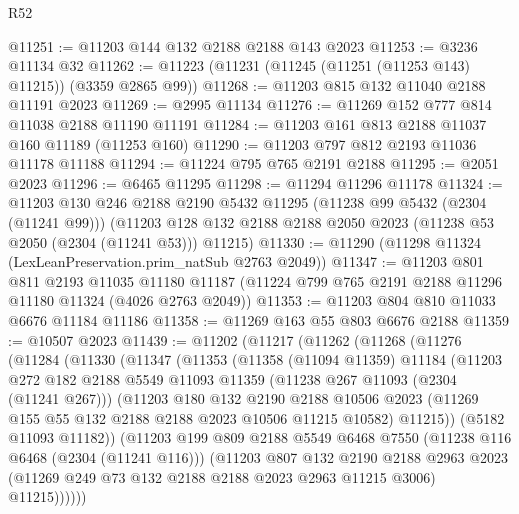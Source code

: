\begin{lexlean}{R52}
\begin{coremodule}
@11251 := @11203 @144 @132 @2188 @2188 @143 @2023
@11253 := @3236 @11134 @32
@11262 := @11223 (@11231 (@11245 (@11251 (@11253 @143) @11215)) (@3359 @2865 @99))
@11268 := @11203 @815 @132 @11040 @2188 @11191 @2023
@11269 := @2995 @11134
@11276 := @11269 @152 @777 @814 @11038 @2188 @11190 @11191
@11284 := @11203 @161 @813 @2188 @11037 @160 @11189 (@11253 @160)
@11290 := @11203 @797 @812 @2193 @11036 @11178 @11188
@11294 := @11224 @795 @765 @2191 @2188
@11295 := @2051 @2023
@11296 := @6465 @11295
@11298 := @11294 @11296 @11178
@11324 := @11203
    @130
    @246
    @2188
    @2190
    @5432
    @11295
    (@11238 @99 @5432 (@2304 (@11241 @99)))
    (@11203 @128 @132 @2188 @2188 @2050 @2023 (@11238 @53 @2050 (@2304 (@11241 @53))) @11215)
@11330 := @11290 (@11298 @11324 (LexLeanPreservation.prim_natSub @2763 @2049))
@11347 := @11203
    @801
    @811
    @2193
    @11035
    @11180
    @11187
    (@11224 @799 @765 @2191 @2188 @11296 @11180 @11324 (@4026 @2763 @2049))
@11353 := @11203 @804 @810 @11033 @6676 @11184 @11186
@11358 := @11269 @163 @55 @803 @6676 @2188
@11359 := @10507 @2023
@11439 := @11202
    (@11217
      (@11262
        (@11268
          (@11276
            (@11284
              (@11330
                (@11347
                  (@11353
                    (@11358
                      (@11094 @11359)
                      @11184
                      (@11203
                        @272
                        @182
                        @2188
                        @5549
                        @11093
                        @11359
                        (@11238 @267 @11093 (@2304 (@11241 @267)))
                        (@11203
                          @180
                          @132
                          @2190
                          @2188
                          @10506
                          @2023
                          (@11269 @155 @55 @132 @2188 @2188 @2023 @10506 @11215 @10582)
                          @11215))
                      (@5182 @11093 @11182))
                    (@11203
                      @199
                      @809
                      @2188
                      @5549
                      @6468
                      @7550
                      (@11238 @116 @6468 (@2304 (@11241 @116)))
                      (@11203
                        @807
                        @132
                        @2190
                        @2188
                        @2963
                        @2023
                        (@11269 @249 @73 @132 @2188 @2188 @2023 @2963 @11215 @3006)
                        @11215))))))

\end{coremodule}
\end{lexlean}
